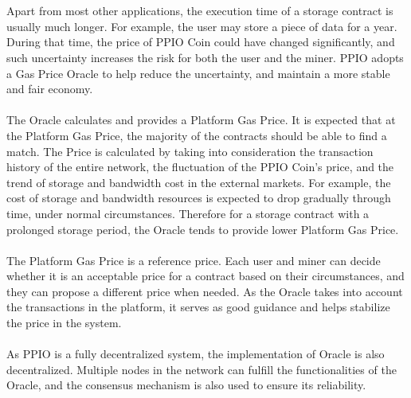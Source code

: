 \documentclass[10pt,a4paper]{article}
\begin{document}
 \vspace{-0.5em}
\\ \\Apart from most other applications, the execution time of a storage contract is usually much longer. For example, the user may store a piece of data for a year. During that time, the price of PPIO Coin could have changed significantly, and such uncertainty increases the risk for both the user and the miner. PPIO adopts a Gas Price Oracle to help reduce the uncertainty, and maintain a more stable and fair economy.
 \vspace{-0.5em}
\\ \\The Oracle calculates and provides a Platform Gas Price. It is expected that at the Platform Gas Price, the majority of the contracts should be able to find a match. The Price is calculated by taking into consideration the transaction history of the entire network, the fluctuation of the PPIO Coin’s price, and the trend of storage and bandwidth cost in the external markets. For example, the cost of storage and bandwidth resources is expected to drop gradually through time, under normal circumstances. Therefore for a storage contract with a prolonged storage period, the Oracle tends to provide lower Platform Gas Price.
 \vspace{-0.5em}
\\\\The Platform Gas Price is a reference price. Each user and miner can decide whether it is an acceptable price for a contract based on their circumstances, and they can propose a different price when needed. As the Oracle takes into account the transactions in the platform, it serves as good guidance and helps stabilize the price in the system.
 \vspace{-0.5em}
\\\\As PPIO is a fully decentralized system, the implementation of Oracle is also decentralized. Multiple nodes in the network can fulfill the functionalities of the Oracle, and the consensus mechanism is also used to ensure its reliability.      
 \vspace{-0.5em}
\end{document}
